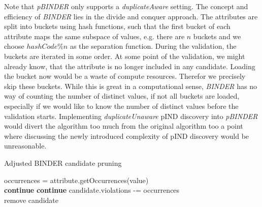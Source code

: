 Note that \textit{pBINDER} only supports a \textit{duplicateAware} setting. The concept and efficiency of \textit{BINDER} lies in the divide and conquer approach. The attributes are split into buckets using hash functions, such that the first bucket of each attribute maps the same subspace of values, e.g. there are $n$ buckets and we choose $hashCode \% n$ as the separation function. During the validation, the buckets are iterated in some order. At some point of the validation, we might already know, that the attribute is no longer included in any candidate. Loading the bucket now would be a waste of compute resources. Therefor we precisely skip these buckets. While this is great in a computational sense, \textit{BINDER} has no way of counting the number of distinct values, if not all buckets are loaded, especially if we would like to know the number of distinct values before the validation starts. Implementing \textit{duplicateUnaware} pIND discovery into \textit{pBINDER} would divert the algorithm too much from the original algorithm too a point where discussing the newly introduced complexity of pIND discovery would be unreasonable.

\begin{algorithm}
    \caption{Adjusted BINDER candidate pruning}\label{alg:BINDER_prune}
     {
        occurrences = attribute.getOccurrences(value) \\
         {
             { 
                \textbf{continue}
            }
             {
                \textbf{continue}
            }
            candidate.violations -= occurrences \\
             {
                remove candidate
            }
        }
    }
\end{algorithm}




